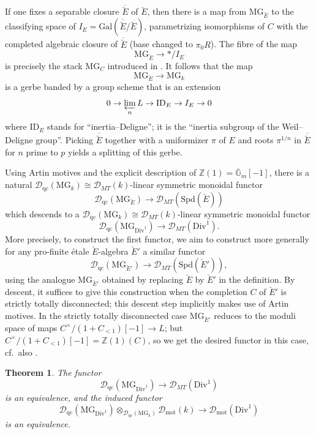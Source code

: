 \documentclass[11pt]{amsart}
\numberwithin{equation}{section}
\newtheorem{theorem}{Theorem}
\numberwithin{theorem}{section}
\theoremstyle{definition}
\newcommand{\Div}{\mathrm{Div}}
\begin{document}
If one fixes a separable closure $\overline{\breve{E}}$ of $\breve{E}$, then there is a map from $\mathrm{MG}_{\breve{E}}$ to the classifying space of $I_E=\mathrm{Gal}(\overline{\breve{E}}/\breve{E})$, parametrizing isomorphisms of $C$ with the completed algebraic closure of $\overline{\breve{E}}$ (base changed to $\pi_0 R$). The fibre of the map
\[
\mathrm{MG}_{\breve{E}}\to \ast/I_E
\]
is precisely the stack $\mathrm{MG}_C$ introduced in \cite{BerkovichMotives}. It follows that the map
\[
\mathrm{MG}_{\breve{E}}\to \mathrm{MG}_k
\]
is a gerbe banded by a group scheme that is an extension
\[
0\to \varprojlim_n L\to \mathrm{ID}_E\to I_E\to 0
\]
where $\mathrm{ID}_E$ stands for ``inertia--Deligne''; it is the ``inertia subgroup of the Weil--Deligne group''. Picking $\overline{\breve{E}}$ together with a uniformizer $\pi$ of $E$ and roots $\pi^{1/n}$ in $\overline{\breve{E}}$ for $n$ prime to $p$ yields a splitting of this gerbe.

Using Artin motives and the explicit description of $\mathbb Z(1)=\overline{\mathbb G}_m[-1]$, there is a natural $\mathcal D_{\mathrm{qc}}(\mathrm{MG}_k)\cong \mathcal D_{MT}(k)$-linear symmetric monoidal functor
\[
\mathcal D_{\mathrm{qc}}(\mathrm{MG}_{\breve{E}})\to \mathcal D_{MT}(\mathrm{Spd}(\breve{E}))
\]
which descends to a $\mathcal D_{\mathrm{qc}}(\mathrm{MG}_k)\cong \mathcal D_{MT}(k)$-linear symmetric monoidal functor
\[
\mathcal D_{\mathrm{qc}}(\mathrm{MG}_{\Div^1})\to \mathcal D_{MT}(\Div^1).
\]
More precisely, to construct the first functor, we aim to construct more generally for any pro-finite \'etale $\breve{E}$-algebra $\breve{E}'$ a similar functor
\[
\mathcal D_{\mathrm{qc}}(\mathrm{MG}_{\breve{E}'})\to \mathcal D_{MT}(\mathrm{Spd}(\breve{E}')),
\]
using the analogue $\mathrm{MG}_{\breve{E}'}$ obtained by replacing $\breve{E}$ by $\breve{E}'$ in the definition. By descent, it suffices to give this construction when the completion $C$ of $\breve{E}'$ is strictly totally disconnected; this descent step implicitly makes use of Artin motives. In the strictly totally disconnected case $\mathrm{MG}_{\breve{E}'}$ reduces to the moduli space of maps $C^\times/(1+C_{<1})[-1]\to L$; but $C^\times/(1+C_{<1})[-1] = \mathbb Z(1)(C)$, so we get the desired functor in this case, cf.~also \cite[Section 11]{BerkovichMotives}.

\begin{theorem} The functor
\[
\mathcal D_{\mathrm{qc}}(\mathrm{MG}_{\Div^1})\to \mathcal D_{MT}(\Div^1)
\]
is an equivalence, and the induced functor
\[
\mathcal D_{\mathrm{qc}}(\mathrm{MG}_{\Div^1})\otimes_{\mathcal D_{\mathrm{qc}}(\mathrm{MG}_k)} \mathcal D_{\mathrm{mot}}(k)\to \mathcal D_{\mathrm{mot}}(\Div^1)
\]
is an equivalence.
\end{theorem}
\end{document}
